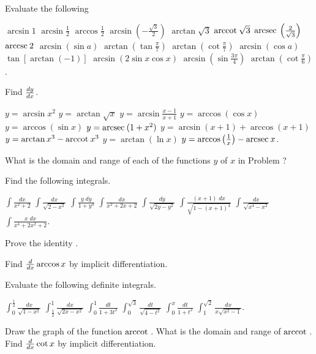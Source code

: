 \begin{exercises}

Evaluate the following
\begin{exenum}
\x
$\arcsin 1$
\x
$\arcsin \frac12$
\x
$\arccos \frac12$
\x
$\arcsin \left(- \frac{\sqrt3}2\right)$
\x
$\arctan \sqrt3$
\x
$\mathrm{arccot\:} \sqrt{3}$
\x
$\mathrm{arcsec\:} \left( \frac2{\sqrt3}\right)$
\x
$\mathrm{arccsc\:} 2$
\x
$\arcsin (\sin a)$
\x
$\arctan \left( \tan \frac{\pi}7 \right)$
\x
$\arctan \left( \cot \frac{\pi}7 \right)$
\x
$\arcsin (\cos a)$
\x
$\tan [\arctan (-1)]$
\x
$\arcsin (2 \sin x \cos x)$
\x
$\arcsin \left( \sin \frac{3\pi}4 \right)$
\x
$\arctan \left( \cot \frac{\pi}6 \right)$.
\end{exenum}

Find $\frac{d y}{d x}$.
\begin{exenum}
\x
$y = \arcsin x^2$
\x
$y = \arctan \sqrt x$
\x
$y = \arcsin \frac{x-1}{x+1}$
\x
$y = \arccos (\cos x)$
\x
$y = \arccos (\sin x)$
\x
$y = \mathrm{arcsec\:} (1+x^2)$
\x
$y = \arcsin(x+1)+\arccos(x+1)$
\x
$y = \arctan x^3 - \mathrm{arccot\:} x^3$
\x
$y = \arctan (\ln x)$
\x
$y = \arccos \left(\frac1x\right) - \mathrm{arcsec\:} x$.
\end{exenum}

What is the domain and range of each of the functions
$y$ of $x$ in Problem ?

Find the following integrals.
\begin{exenum}
\x
$\int \frac{dx}{x^2+2}$
\x
$\int \frac{dx}{\sqrt{2-x^2}}$
\x
$\int \frac{y\;dy}{1+y^4}$
\x
$\int \frac{dx}{x^2+2x+2}$
\x
$\int \frac{dy}{\sqrt{2y-y^2}}$
\x
$\int \frac{(x+1) \; dx}{\sqrt{1-(x+1)^4}}$
\x
$\int \frac{dx}{\sqrt{x^4-x^2}}$
\x
$\int \frac{x\;dx}{x^4+2x^2+2}$.
\end{exenum}

Prove the identity .

Find $\frac{d}{dx} \arccos x$ by implicit differentiation.

Evaluate the following definite integrals.
\begin{exenum}
\x
$\int_{0}^{\frac12} \frac{dx}{\sqrt{1-x^2}}$
\x
$\int_{\frac12}^{1} \frac{dx}{\sqrt{2x-x^2}}$
\x
$\int_{0}^{1} \frac{dt}{1+3t^2}$
\x
$\int_{0}^{\sqrt{3}} \frac{dt}{\sqrt{4-t^2}}$
\x
$\int_{0}^{x} \frac{dt}{1+t^2}$
\x
$\int_{1}^{\sqrt{2}} \frac{dx}{x\sqrt{x^2-1}}$.
\end{exenum}

\begin{exenum}
\x
Draw the graph of the function $\mathrm{arccot\:}$.
\x
What is the domain and range of $\mathrm{arccot\:}$.
\x
Find $\frac{d}{dx} \cot x$ by implicit differentiation.
\end{exenum}


\end{exercises}
